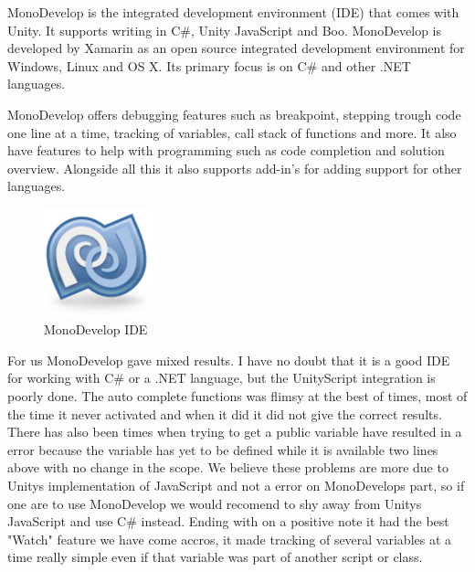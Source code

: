 MonoDevelop is the integrated development environment (IDE) that comes with Unity. It supports writing in C\#, Unity JavaScript and Boo.
MonoDevelop is developed by Xamarin \cite{xamarinRef} as an open source integrated development environment for Windows, Linux and OS X.
Its primary focus is on C\# and other .NET languages.


MonoDevelop offers debugging features such as breakpoint, stepping trough code one line at a time, tracking of variables, call stack of functions and more.
It also have features to help with programming such as code completion and solution overview. Alongside all this it also supports add-in's for adding support for other languages.


\begin{figure}
	\capstart
	\centering
	\vspace{-10pt}
	\includegraphics[width=0.28\textwidth]{images/MonoDevelopLogo.png}
	\vspace{-20pt}
	\caption[MonoDevelop IDE Logo]{{M}ono{D}evelop {IDE}}
	\label{fig:monodevelop}
	\vspace{-10px}
\end{figure}

For us MonoDevelop gave mixed results. 
I have no doubt that it is a good IDE for working with C\# or a .NET language, but the UnityScript integration is poorly done.
The auto complete functions was flimsy at the best of times, most of the time it never activated and when it did it did not give the correct results. 
There has also been times when trying to get a public variable have resulted in a error because the variable has yet to be defined while it is available two lines above with no change in the scope.
We believe these problems are more due to Unitys implementation of JavaScript and not a error on MonoDevelops part, so if one are to use MonoDevelop we would recomend to shy away from Unitys JavaScript and use C\# instead.
Ending with on a positive note it had the best "Watch" feature we have come accros, it made tracking of several variables at a time really simple even if that variable was part of another script or class.	
